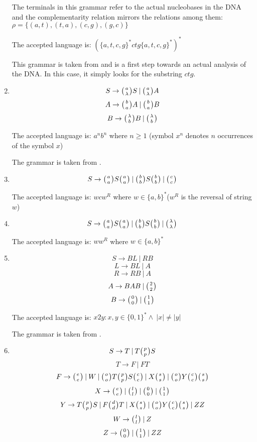 \begin{enumerate}
{     The terminals in this grammar refer to the actual nucleobases in the DNA and the complementarity relation mirrors the relations among them: $\rho = \{(a, t), (t, a), (c, g), (g, c)\}$

    The accepted language is: $(\{a,t,c,g\}^*ctg\{a,t,c,g\}^*)^*$

    This grammar is taken from \cite{WK_GRAMMARS_1} and is a first step towards an actual analysis of the DNA. In this case, it simply looks for the substring $ctg$.
  }

  \item{
    $$S \rightarrow \wkpair{a}{\lambda} S \:|\: \wkpair{a}{\lambda} A$$
    $$A \rightarrow \wkpair{b}{a} A \:|\: \wkpair{b}{a} B$$
    $$B \rightarrow \wkpair{\lambda}{b} B \:|\: \wkpair{\lambda}{b}$$


    The accepted language is: $a^nb^n$ where $n \geq 1$ (symbol $x^n$ denotes $n$ occurrences of the symbol $x$)

    The grammar is taken from \cite{REG_GRAMMAR}.
  }

  \item{
    $$S \rightarrow \wkpair{a}{a} S \wkpair{a}{a} \:|\: \wkpair{b}{b} S \wkpair{b}{b} \:|\: \wkpair{c}{c}$$

    The accepted language is: $wcw^R$ where $w \in \{a, b\}^*$($w^R$ is the reversal of string $w$)
  }

  \item{
    $$S \rightarrow \wkpair{a}{a} S \wkpair{a}{a} \:|\: \wkpair{b}{b} S \wkpair{b}{b} \:|\: \wkpair{\lambda}{\lambda}$$

    The accepted language is: $ww^R$ where $w \in \{a, b\}^*$
  }

  \item{
    $$S \rightarrow B L \:|\: R B$$
    $$L \rightarrow B L \:|\: A$$
    $$R \rightarrow R B \:|\: A$$
    $$A \rightarrow B A B \:|\: \wkpair{2}{2}$$
    $$B \rightarrow \wkpair{0}{0} \:|\: \wkpair{1}{1}$$

    The accepted language is: $x2y: x, y \in \{0,1\}^* \wedge \:|x| \neq |y|$

    The grammar is taken from \cite{GRAMMAR_9}.
  }

  \item{
    $$S \rightarrow T \:|\: T \wkpair{p}{p} S$$
    $$T \rightarrow F \:|\: F T$$
    $$F \rightarrow \wkpair{e}{e} \:|\: W \:|\: \wkpair{o}{o} T \wkpair{p}{p} S \wkpair{c}{c} \:|\: X \wkpair{s}{s} \:|\: \wkpair{o}{o} Y \wkpair{c}{c} \wkpair{s}{s}$$
    $$X \rightarrow \wkpair{e}{e} \:|\: \wkpair{l}{l} \:|\: \wkpair{0}{0} \:|\: \wkpair{1}{1}$$
    $$Y \rightarrow T \wkpair{p}{p} S \:|\: F \wkpair{d}{d} T \:|\: X \wkpair{s}{s} \:|\: \wkpair{o}{o} Y \wkpair{c}{c} \wkpair{s}{s} \:|\: Z Z$$
    $$W \rightarrow \wkpair{l}{l} \:|\: Z$$
    $$Z \rightarrow \wkpair{0}{0} \:|\: \wkpair{1}{1} \:|\: Z Z$$

}
\end{enumerate}

